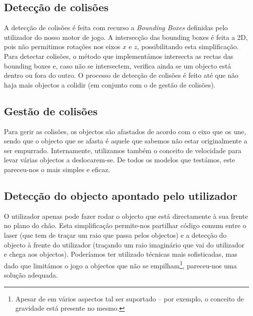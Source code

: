 \documentclass[11pt,a4paper]{article}
\begin{document}
\subsection{Detecção de colisões}

A detecção de colisões é feita com recurso a \emph{Bounding Boxes} definidas pelo utilizador do nosso motor de jogo. A intersecção das bounding boxes é feita a 2D, pois não permitimos rotações nos eixos $x$ e $z$, possibilitando esta simplificação. Para detectar colisões, o método que implementámos intersecta as rectas das bounding boxes e, caso não se intersectem, verifica ainda se um objecto está dentro ou fora do outro. O processo de detecção de colisões é feito até que não haja mais objectos a colidir (em conjunto com o de gestão de colisões).

\subsection{Gestão de colisões}

Para gerir as colisões, os objectos são afastados de acordo com o eixo que os une, sendo que o objecto que se afasta é aquele que sabemos não estar originalmente a ser empurrado. Internamente, utilizamos também o conceito de velocidade para levar várias objectos a deslocarem-se. De todos os modelos que testámos, este pareceu-nos o mais simples e eficaz.

\subsection{Detecção do objecto apontado pelo utilizador}
O utilizador apenas pode fazer rodar o objecto que está directamente à sua frente no plano do chão. Esta simplificação permite-nos partilhar código comum entre o laser (que tem de traçar um raio que passa pelos objectos) e a detecção do objecto à frente do utilizador (traçando um raio imaginário que vai do utilizador e chega aos objectos). Poderíamos ter utilizado técnicas mais sofisticadas, mas dado que limitámos o jogo a objectos que não se empilham\footnote{Apesar de em vários aspectos tal ser suportado -- por exemplo, o conceito de gravidade está presente no mesmo.}, pareceu-nos uma solução adequada.
\end{document}
